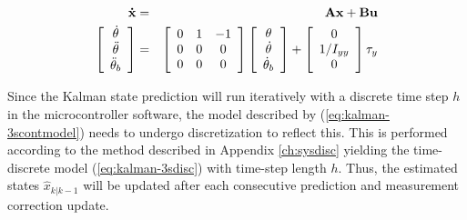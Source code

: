 \documentclass[a4paper]{report}
\begin{document}
\begin{eqnarray}
	\mathbf{\dot{x}} & = & \mathbf{ A x } + \mathbf{ B u } \nonumber \\
		\left[
      		\begin{array}{c}
      		\dot{\theta}\\
		\ddot{\theta}\\
		\ddot{\theta}_{b}
      		\end{array} \right]
		& = &
		\left[
		\begin{array}{c c c}
		0 &   1 & -1 \\
		0 & 0 & 0 \\
		0 & 0 & 0 \\
		\end{array} \right]
		\left[
		\begin{array}{c}
		\theta\\
		\dot{\theta}\\
		\dot{\theta}_{b}
		\end{array} \right]
		+
		\left[
      		\begin{array}{c}
      		0\\
		1/I_{yy}\\
		0
      		\end{array} \right]
		\tau_y
		\label{eq:kalman-3scontmodel}
\end{eqnarray}

Since the Kalman state prediction will run iteratively with a discrete time step $h$ in the microcontroller software, the model described by (\ref{eq:kalman-3scontmodel}) needs to undergo discretization to reflect this. This is performed according to the method described in Appendix \ref{ch:sysdisc} yielding the time-discrete model (\ref{eq:kalman-3sdisc}) with time-step length $h$. Thus, the estimated states $\hat{x}_{k|k-1}$ will be updated after each consecutive prediction and measurement correction update. 
\end{document}
